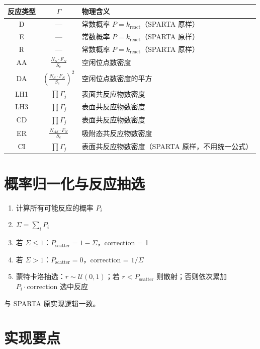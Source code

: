 \documentclass[12pt,a4paper]{article}
\begin{document}
\begin{center}
\begin{tabular}{c|c|l}
\toprule
\textbf{反应类型} & \textbf{$\Gamma$} & \textbf{物理含义} \\
\midrule
D & — & 常数概率 $P = k_{\text{react}}$（SPARTA 原样）\\
E & — & 常数概率 $P = k_{\text{react}}$（SPARTA 原样）\\
R & — & 常数概率 $P = k_{\text{react}}$（SPARTA 原样）\\
\midrule
AA & $\displaystyle \frac{N_S \cdot F_N}{S_e}$ & 空闲位点数密度 \\
DA & $\displaystyle \left(\frac{N_S \cdot F_N}{S_e}\right)^2$ & 空闲位点数密度的平方 \\
LH1 & $\displaystyle \prod \Gamma_j$ & 表面共反应物数密度 \\
LH3 & $\displaystyle \prod \Gamma_j$ & 表面共反应物数密度 \\
CD & $\displaystyle \prod \Gamma_j$ & 表面共反应物数密度 \\
ER & $\displaystyle \frac{N_{AS} \cdot F_N}{S_e}$ & 吸附态共反应物数密度 \\
\midrule
CI & $\displaystyle \prod \Gamma_j$ & 表面共反应物数密度（SPARTA 原样，不用统一公式）\\
\bottomrule
\end{tabular}
\end{center}

\section{概率归一化与反应抽选}
\begin{enumerate}
  \item 计算所有可能反应的概率 $P_i$
  \item $\Sigma = \sum_i P_i$
  \item 若 $\Sigma \le 1$：$P_{\mathrm{scatter}} = 1 - \Sigma$，correction = 1
  \item 若 $\Sigma > 1$：$P_{\mathrm{scatter}} = 0$，correction = $1/\Sigma$
  \item 蒙特卡洛抽选：$r \sim \mathcal{U}(0,1)$；若 $r < P_{\mathrm{scatter}}$ 则散射；否则依次累加 $P_i \cdot \mathrm{correction}$ 选中反应
\end{enumerate}

与 SPARTA 原实现逻辑一致。

\section{实现要点}
\end{document}

